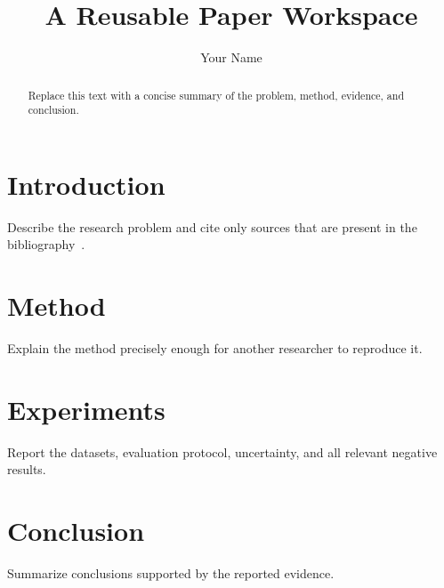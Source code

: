 \documentclass[letterpaper]{article}
\title{A Reusable Paper Workspace}
\author{Your Name}
\begin{document}
\maketitle

\begin{abstract}
Replace this text with a concise summary of the problem, method, evidence, and conclusion.
\end{abstract}

\section{Introduction}
Describe the research problem and cite only sources that are present in the bibliography~\cite{lamport1994latex}.

\section{Method}
Explain the method precisely enough for another researcher to reproduce it.

\section{Experiments}
Report the datasets, evaluation protocol, uncertainty, and all relevant negative results.

\section{Conclusion}
Summarize conclusions supported by the reported evidence.



\end{document}
